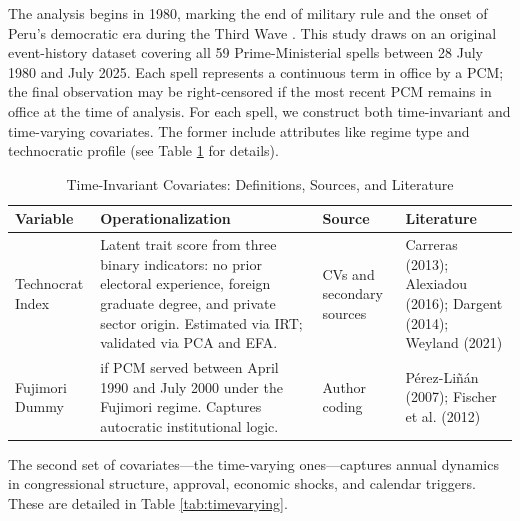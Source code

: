 \documentclass[a4paper, 12pt]{article}
\begin{document}
The analysis begins in 1980, marking the end of military rule and the onset of Peru’s democratic era during the Third Wave \citet{huntington_tercera_2002}. This study draws on an original event-history dataset covering all 59 Prime-Ministerial spells between 28 July 1980 and July 2025. Each spell represents a continuous term in office by a PCM; the final observation may be right-censored if the most recent PCM remains in office at the time of analysis. For each spell, we construct both time-invariant and time-varying covariates. The former include attributes like regime type and technocratic profile (see Table \ref{tab:timeinvariant} for details).



\begin{table}[htbp]
\small
\centering
\caption{Time-Invariant Covariates: Definitions, Sources, and Literature}
\label{tab:timeinvariant}
\begin{tabularx}{\textwidth}{
  >{\raggedright\arraybackslash}p{2cm}
  >{\raggedright\arraybackslash}p{5cm}
  >{\raggedright\arraybackslash}p{2cm}
  >{\raggedright\arraybackslash}p{3.5cm}
}
\toprule
\textbf{Variable} & \textbf{Operationalization} & \textbf{Source} & \textbf{Literature} \\
\midrule

Technocrat Index &
Latent trait score from three binary indicators: no prior electoral experience, foreign graduate degree, and private sector origin. Estimated via IRT; validated via PCA and EFA. &
CVs and secondary sources &
Carreras (2013); Alexiadou (2016); Dargent (2014); Weyland (2021) \\

Fujimori Dummy &
1 if PCM served between April 1990 and July 2000 under the Fujimori regime. Captures autocratic institutional logic. &
Author coding &
Pérez-Liñán (2007); Fischer et al. (2012) \\

\bottomrule
\end{tabularx}
\end{table}

The second set of covariates—the time-varying ones—captures annual dynamics in congressional structure, approval, economic shocks, and calendar triggers. These are detailed in Table \ref{tab:timevarying}.


\end{document}
